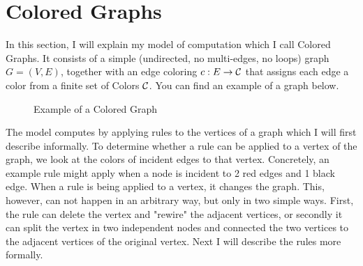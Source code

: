 \section{Colored Graphs}

In this section, I will explain my model of computation which I call Colored Graphs.
It consists of a simple (undirected, no multi-edges, no loops) graph $G = (V, E)$,
together with an edge coloring $c : E \to \mathcal{C}$ that assigns each edge a color from a finite set of Colors $\mathcal{C}$.
You can find an example of a graph below.

\begin{figure}[H]
    \label{fig:graph1}
    \centering
    \caption{Example of a Colored Graph}
\end{figure}


The model computes by applying rules to the vertices of a graph which I will first describe informally.
To determine whether a rule can be applied to a vertex of the graph, we look at the colors of incident edges to that vertex.
Concretely, an example rule might apply when a node is incident to 2 red edges and 1 black edge.
When a rule is being applied to a vertex, it changes the graph.
This, however, can not happen in an arbitrary way, but only in two simple ways.
First, the rule can delete the vertex and "rewire" the adjacent vertices, or secondly it can split the vertex in two independent nodes and connected the two vertices to the adjacent vertices of the original vertex.
Next I will describe the rules more formally.

